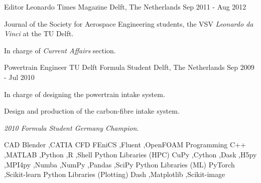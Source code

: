\documentclass[11pt, a4paper]{preamble/awesome-cv-novo}
\begin{document}


\begin{cventries}

  \cventry
    {Editor} %
    {Leonardo Times Magazine} %
    {Delft, The Netherlands} %
    {Sep 2011 - Aug 2012} %
    {
      \begin{cvitems} %
        \item {Journal of the Society for Aerospace Engineering students, the VSV \textit{Leonardo da Vinci} at the TU Delft.}
        \item {In charge of \textit{Current Affairs} section.}
      \end{cvitems}
    }

  \cventry
    {Powertrain Engineer}
    {TU Delft Formula Student}
    {Delft, The Netherlands}
    {Sep 2009 - Jul 2010}
    {
      \begin{cvitems}
        \item {In charge of designing the powertrain intake system.}
        \item {Design and production of the carbon-fibre intake system.}
        \item {\textit{2010 Formula Student Germany Champion.}}
      \end{cvitems}
    }

\end{cventries}





  \begin{cvskills}
    \cvskill
      {CAD}
      {Blender \sep CATIA}
    \cvskill
      {CFD}
      {FEniCS \sep Fluent \sep OpenFOAM}
    \cvskill
      {Programming}
      {C++ \sep MATLAB \sep Python \sep R \sep Shell}
    \cvskill
      {Python Libraries (HPC)}
      {CuPy \sep Cython \sep Dask \sep H5py \sep MPI4py \sep Numba \sep NumPy \sep Pandas \sep SciPy}
    \cvskill
      {Python Libraries (ML)}
      {PyTorch \sep Scikit-learn}
    \cvskill
      {Python Libraries (Plotting)}
      {Dash \sep Matplotlib \sep Scikit-image}
  \end{cvskills}
\end{document}
